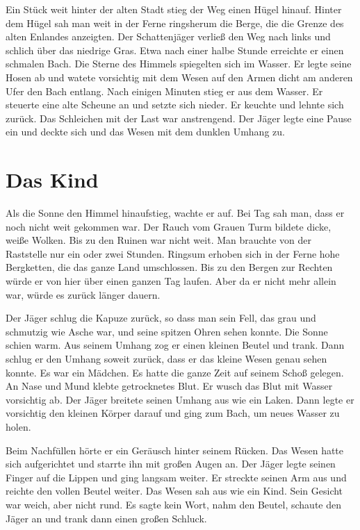 \documentclass[12pt,a4paper,onecolumn,twoside,ngerman]{book}
\newcommand{\Enland}{Enland}
\begin{document}
Ein Stück weit hinter der alten Stadt stieg der Weg einen Hügel hinauf. Hinter dem Hügel sah man weit in der Ferne ringsherum die Berge, die die Grenze des alten \Enland{es} anzeigten. Der Schattenjäger verließ den Weg nach links und schlich über das niedrige Gras. Etwa nach einer halbe Stunde erreichte er einen schmalen Bach. Die Sterne des Himmels spiegelten sich im Wasser. Er legte seine Hosen ab und watete vorsichtig mit dem Wesen auf den Armen dicht am anderen Ufer den Bach entlang. Nach einigen Minuten stieg er aus dem Wasser. Er steuerte eine alte Scheune an und setzte sich nieder. Er keuchte und lehnte sich zurück. Das Schleichen mit der Last war anstrengend. Der Jäger legte eine Pause ein und deckte sich und das Wesen mit dem dunklen Umhang zu.

\section{Das Kind}
Als die Sonne den Himmel hinaufstieg, wachte er auf. Bei Tag sah man, dass er noch nicht weit gekommen war. Der Rauch vom Grauen Turm bildete dicke, weiße Wolken. Bis zu den Ruinen war nicht weit. Man brauchte von der Raststelle nur ein oder zwei Stunden. Ringsum erhoben sich in der Ferne hohe Bergketten, die das ganze Land umschlossen. Bis zu den Bergen zur Rechten würde er von hier über einen ganzen Tag laufen. Aber da er nicht mehr allein war, würde es zurück länger dauern.

Der Jäger schlug die Kapuze zurück, so dass man sein Fell, das grau und schmutzig wie Asche war, und seine spitzen Ohren sehen konnte. Die Sonne schien warm. Aus seinem Umhang zog er einen kleinen Beutel und trank. Dann schlug er den Umhang soweit zurück, dass er das kleine Wesen genau sehen konnte. Es war ein Mädchen. Es hatte die ganze Zeit auf seinem Schoß gelegen. An Nase und Mund klebte getrocknetes Blut. Er wusch das Blut mit Wasser vorsichtig ab. Der Jäger breitete seinen Umhang aus wie ein Laken. Dann legte er vorsichtig den kleinen Körper darauf und ging zum Bach, um neues Wasser zu holen.

Beim Nachfüllen hörte er ein Geräusch hinter seinem Rücken. Das Wesen hatte sich aufgerichtet und starrte ihn mit großen Augen an. Der Jäger legte seinen Finger auf die Lippen und ging langsam weiter. Er streckte seinen Arm aus und reichte den vollen Beutel weiter. Das Wesen sah aus wie ein Kind. Sein Gesicht war weich, aber nicht rund. Es sagte kein Wort, nahm den Beutel, schaute den Jäger an und trank dann einen großen Schluck. 
\end{document}
